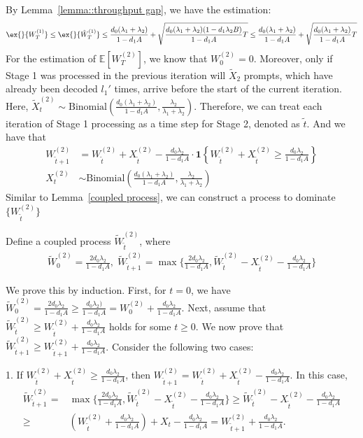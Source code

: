 \documentclass[opre, nonblindrev]{informs3} %
\begin{document}
By Lemma~\ref{lemma::throughput gap}, we have the estimation:
$$\ex{}{W_{T}^{(1)}}\leq \ex{}{\hat{W}_T^{(1)}}\leq \frac{d_0 (\lambda_1+\lambda_2)}{1-d_1 A}+\sqrt{\frac{d_0 (\lambda_1+\lambda_2)(1-d_1\lambda_2 B)}{1-d_1 A}T}\leq \frac{d_0 (\lambda_1+\lambda_2)}{1-d_1 A}+\sqrt{\frac{d_0 (\lambda_1+\lambda_2)}{1-d_1 A}T}$$
For the estimation of $\mathbb{E}[W_T^{(2)}]$, we know that $W_0^{(2)} = 0$. Moreover, only if Stage 1 was processed in the previous iteration will $\tilde{X}_2$ prompts, which have already been decoded $l_1'$ times, arrive before the start of the current iteration. Here, $\tilde{X}_t^{(2)} \sim \text{Binomial}(\frac{d_0 (\lambda_1+\lambda_2)}{1-d_1 A}, \frac{\lambda_2}{\lambda_1+\lambda_2})$. Therefore, we can treat each iteration of Stage 1 processing as a time step for Stage 2, denoted as $\tilde{t}$. And we have that 
\begin{align*}
W_{\tilde{t}+1}^{(2)}&=W_{\tilde{t}}^{(2)}+X_{\tilde{t}}^{(2)}-\frac{d_0\lambda_2}{1-d_1A}\cdot \mathbf{1}\left\{W_{\tilde{t}}^{(2)} + X_{\tilde{t}}^{(2)} \geq \frac{d_0\lambda_2}{1-d_1A} \right\}\\
X_t^{(2)} &\sim \text{Binomial}(\frac{d_0 (\lambda_1+\lambda_2)}{1-d_1 A}, \frac{\lambda_2}{\lambda_1+\lambda_2})
\end{align*}
Similar to Lemma~\ref{coupled process}, we can construct a process to dominate $\{W_{\tilde{t}}^{(2)}\}$
\begin{lemma}
    Define a coupled process $\tilde{W}_{\tilde{t}}^{(2)}$, where
    \begin{align*}
\tilde{W}_{0}^{(2)}=\frac{2d_0 \lambda_2}{1-d_1 A},\;\tilde{W}_{\tilde{t}+1}^{(2)}=\max\{\frac{2d_0 \lambda_2}{1-d_1 A},\tilde{W}_{\tilde{t}}^{(2)}-X_{\tilde{t}}^{(2)}-\frac{d_0\lambda_2}{1-d_1A}\}
    \end{align*}
\end{lemma}
We prove this by induction. First, for $t = 0$, we have $\tilde{W}_{0}^{(2)}=\frac{2d_0 \lambda_2}{1-d_1 A}\geq \frac{d_0 \lambda_2)}{1-d_1 A}={W}_{0}^{(2)}+\frac{d_0 \lambda_2}{1-d_1 A}$. Next, assume that $\tilde{W}_{\tilde{t}}^{(2)} \geq W_{\tilde{t}}^{(2)} + \frac{d_0 \lambda_2}{1-d_1 A}$ holds for some $t \geq 0$. We now prove that $\tilde{W}_{\tilde{t}+1}^{(2)} \geq W_{\tilde{t}+1}^{(2)}  + \frac{d_0 \lambda_2}{1-d_1 A}$. Consider the following two cases:

1. If $W_{\tilde{t}}^{(2)} + X_{\tilde{t}}^{(2)} \geq \frac{d_0\lambda_2}{1-d_1A}$, then ${W}_{\tilde{t}+1}^{(2)} = {W}_{\tilde{t}}^{(2)}+X_{\tilde{t}}^{(2)}-\frac{d_0\lambda_2}{1-d_1A}$. In this case,
\begin{align*}
    \tilde{W}_{\tilde{t}+1}^{(2)}=&\max\{\frac{2d_0 \lambda_2}{1-d_1 A},\tilde{W}_{\tilde{t}}^{(2)}-X_{\tilde{t}}^{(2)}-\frac{d_0\lambda_2}{1-d_1A}\}\geq \tilde{W}_{\tilde{t}}^{(2)}-X_{\tilde{t}}^{(2)}-\frac{d_0\lambda_2}{1-d_1A}\\
    \geq&( W_{\tilde{t}}^{(2)}+\frac{d_0\lambda_2}{1-d_1A} )+ X_t - \frac{d_0\lambda_2}{1-d_1A}=W_{\tilde{t}+1}^{(2)}+\frac{d_0\lambda_2}{1-d_1A}.
\end{align*}
\end{document}

